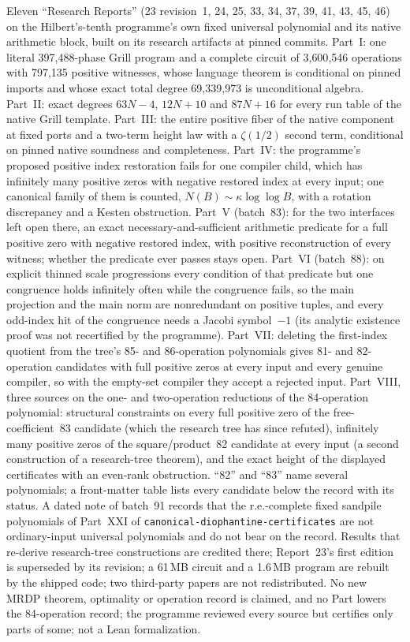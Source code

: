 \documentclass[11pt]{article}
\newcommand{\dir}[1]{\texttt{#1}}
\begin{document}
{Eleven ``Research Reports'' (23 revision~1, 24, 25, 33, 34, 37, 39, 41, 43,
45, 46) on the
Hilbert's-tenth programme's own fixed universal polynomial and its native
arithmetic block, built on its research artifacts at pinned commits.
Part~I: one literal 397{,}488-phase Grill program and a complete circuit of
3{,}600{,}546 operations with 797{,}135 positive witnesses, whose language
theorem is conditional on pinned imports and whose exact total degree
69{,}339{,}973 is unconditional algebra.  Part~II: exact degrees $63N-4$,
$12N+10$ and $87N+16$ for every run table of the native Grill template.
Part~III: the entire positive fiber of the native component at fixed ports
and a two-term height law with a $\zeta(1/2)$ second term, conditional on
pinned native soundness and completeness.  Part~IV: the programme's proposed
positive index restoration fails for one compiler child, which has
infinitely many positive zeros with negative restored index at every input;
one canonical family of them is counted, $N(B)\sim\kappa\log\log B$, with a
rotation discrepancy and a Kesten obstruction.  Part~V (batch~83): for the
two interfaces left open there, an exact necessary-and-sufficient
arithmetic predicate for a full positive zero with negative restored index,
with positive reconstruction of every witness; whether the predicate ever
passes stays open.  Part~VI (batch~88): on explicit thinned scale
progressions every condition of that predicate but one congruence holds
infinitely often while the congruence fails, so the main projection and
the main norm are nonredundant on positive tuples, and every odd-index hit
of the congruence needs a Jacobi symbol~$-1$ (its analytic existence proof
was not recertified by the programme).  Part~VII: deleting the
first-index quotient from the tree's 85- and 86-operation polynomials
gives 81- and 82-operation candidates with full positive zeros at every
input and every genuine compiler, so with the empty-set compiler they
accept a rejected input.
Part~VIII, three sources on the one- and two-operation reductions of the
84-operation polynomial: structural constraints on every full positive
zero of the free-coefficient~83 candidate (which the research tree has
since refuted), infinitely many positive zeros of the square/product~82
candidate at every input (a second construction of a research-tree
theorem), and the exact height of the displayed certificates with an
even-rank obstruction.  ``82'' and ``83'' name several polynomials; a
front-matter table lists every candidate below the record with its status.
A dated note of batch~91 records that the r.e.-complete fixed sandpile
polynomials of Part~XXI of \dir{canonical-diophantine-certificates} are
not ordinary-input universal polynomials and do not bear on the record.
Results that re-derive research-tree constructions are
credited there; Report~23's first edition is superseded by its
revision; a 61\,MB circuit and a 1.6\,MB program are rebuilt by the shipped
code; two third-party papers are not redistributed.  No new MRDP theorem,
optimality or operation record is claimed, and no Part lowers the
84-operation record; the programme reviewed every
source but certifies only parts of some; not a Lean formalization.}
\end{document}
